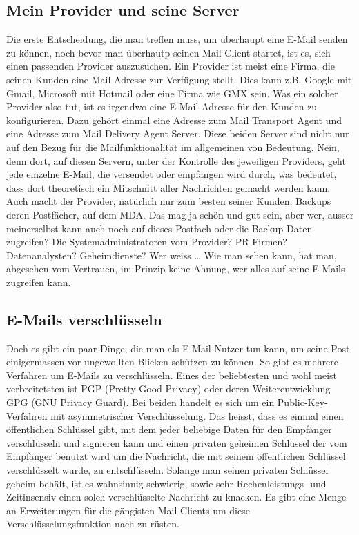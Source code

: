 \subsection{Mein Provider und seine Server}
Die erste Entscheidung, die man treffen muss, um überhaupt eine E-Mail senden zu können, noch bevor man überhautp seinen Mail-Client startet, ist es, sich einen passenden Provider auszusuchen. Ein Provider ist meist eine Firma, die seinen Kunden eine Mail Adresse zur Verfügung stellt. Dies kann z.B. Google mit Gmail, Microsoft mit Hotmail oder eine Firma wie GMX sein. Was ein solcher Provider also tut, ist es irgendwo eine E-Mail Adresse für den Kunden zu konfigurieren. Dazu gehört einmal eine Adresse zum Mail Transport Agent und eine Adresse zum Mail Delivery Agent Server.
Diese beiden Server sind nicht nur auf den Bezug für die Mailfunktionalität im allgemeinen von Bedeutung. Nein, denn dort, auf diesen Servern, unter der Kontrolle des jeweiligen Providers, geht jede einzelne E-Mail, die versendet oder empfangen wird durch, was bedeutet, dass dort theoretisch ein Mitschnitt aller Nachrichten gemacht werden kann. Auch macht der Provider, natürlich nur zum besten seiner Kunden, Backups deren Postfächer, auf dem MDA. Das mag ja schön und gut sein, aber wer, ausser meinerselbst kann auch noch auf dieses Postfach oder die Backup-Daten zugreifen? Die Systemadministratoren vom Provider? PR-Firmen? Datenanalysten? Geheimdienste? Wer weiss …
Wie man sehen kann, hat man, abgesehen vom Vertrauen, im Prinzip keine Ahnung, wer alles auf seine E-Mails zugreifen kann.

\subsection{E-Mails verschlüsseln}
Doch es gibt ein paar Dinge, die man als E-Mail Nutzer tun kann, um seine Post einigermassen vor ungewollten Blicken schützen zu können.
So gibt es mehrere Verfahren um E-Mails zu verschlüsseln. Eines der beliebtesten und wohl meist verbreitetsten ist PGP (Pretty Good Privacy) oder deren Weiterentwicklung GPG (GNU Privacy Guard).
Bei beiden handelt es sich um ein Public-Key-Verfahren mit asymmetrischer Verschlüsselung. Das heisst, dass es einmal einen öffentlichen Schlüssel gibt, mit dem jeder beliebige Daten für den Empfänger verschlüsseln und signieren kann und einen privaten geheimen Schlüssel der vom Empfänger benutzt wird um die Nachricht, die mit seinem öffentlichen Schlüssel verschlüsselt wurde, zu entschlüsseln.
Solange man seinen privaten Schlüssel geheim behält, ist es wahnsinnig schwierig, sowie sehr Rechenleistungs- und Zeitinsensiv einen solch verschlüsselte Nachricht zu knacken.
Es gibt eine Menge an Erweiterungen für die gängisten Mail-Clients um diese Verschlüsselungsfunktion nach zu rüsten.

